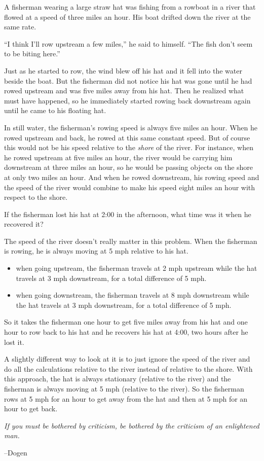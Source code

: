 \documentclass[fleqn,addpoints]{exam}
\begin{document}
\begin{questions}

\question

A fisherman wearing a large straw hat was fishing from a rowboat in a river that flowed at a speed of three miles an
hour.  His boat drifted down the river at the same rate.

``I think I'll row upstream a few miles,'' he said to himself.  ``The fish don't seem to be biting here.''

Just as he started to row, the wind blew off his hat and it fell into the water beside the boat.  But the fisherman did
not notice his hat was gone until he had rowed upstream and was five miles away from his hat.  Then he realized what
must have happened, so he immediately started rowing back downstream again until he came to his floating hat.

In still water, the fisherman's rowing speed is always five miles an hour.  When he rowed upstream and back, he rowed at
this same constant speed.  But of course this would not be his speed relative to the {\em shore} of the river.  For
instance, when he rowed upstream at five miles an hour, the river would be carrying him downstream at three miles an
hour, so he would be passing objects on the shore at only two miles an hour.  And when he rowed downstream, his rowing
speed and the speed of the river would combine to make his speed eight miles an hour with respect to the shore.

If the fisherman lost his hat at 2:00 in the afternoon, what time was it when he recovered it?

\begin{solution}

The speed of the river doesn't really matter in this problem.  When the fisherman is rowing, he is always moving at 5
mph relative to his hat.

\begin{itemize}
  \item when going upstream, the fisherman travels at 2 mph upstream while the hat travels at 3 mph downstream, for a
    total difference of 5 mph.
  \item when going downstream, the fisherman travels at 8 mph downstream while the hat travels at 3 mph downstream, for a
    total difference of 5 mph.
\end{itemize}

So it takes the fisherman one hour to get five miles away from his hat and one hour to row back to his hat and he
recovers his hat at 4:00, two hours after he lost it.

A slightly different way to look at it is to just ignore the speed of the river and do all the calculations
relative to the river instead of relative to the shore.  With this approach, the hat is always stationary (relative to
the river) and the fisherman is always moving at 5 mph (relative to the river).  So the fisherman rows at 5 mph for an
hour to get away from the hat and then at 5 mph for an hour to get back.

\end{solution}

\end{questions}

\ifprintanswers
\else
\vspace{5 in}

{\em If you must be bothered by criticism, be bothered by the criticism of an enlightened man.}

\hspace{1 in} --Dogen

\fi
\end{document}
